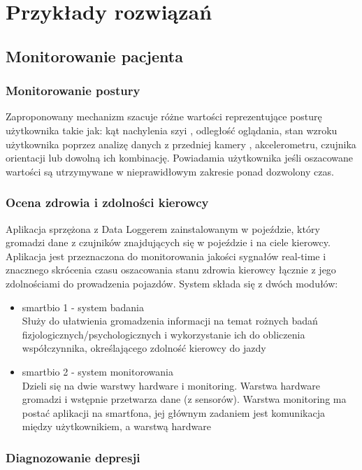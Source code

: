 \chapter{Przykłady rozwiązań}
\label{cha:przyklady_rozw}

\section{Monitorowanie pacjenta}
\label{sec:monitorowanie_pacj}
\subsection{Monitorowanie postury \cite{Lee:2012:MPM:2370216.2370320}}
Zaproponowany mechanizm szacuje różne wartości reprezentujące posturę użytkownika takie jak: kąt nachylenia szyi , odległość oglądania, stan wzroku użytkownika poprzez analizę danych z przedniej kamery , akcelerometru, czujnika orientacji lub dowolną ich kombinację. Powiadamia użytkownika jeśli oszacowane
wartości są utrzymywane w nieprawidłowym zakresie ponad dozwolony czas.

\subsection{Ocena zdrowia i zdolności kierowcy \cite{6583819}}
Aplikacja sprzężona z Data Loggerem zainstalowanym w pojeździe, który gromadzi dane z czujników znajdujących się w pojeździe i na ciele kierowcy. Aplikacja jest przeznaczona do monitorowania jakości sygnałów real-time i znacznego skrócenia czasu oszacowania stanu zdrowia kierowcy łącznie z jego zdolnościami do prowadzenia pojazdów. System składa się z dwóch modułów:
\begin{itemize}
\item smartbio 1 - system badania\\
Służy do ułatwienia gromadzenia informacji na temat rożnych badań fizjologicznych/psychologicznych i wykorzystanie ich do obliczenia współczynnika, określającego zdolność kierowcy do jazdy

\item smartbio 2 - system monitorowania\\
Dzieli się na dwie warstwy hardware i monitoring. Warstwa hardware gromadzi i wstępnie przetwarza dane (z sensorów). Warstwa monitoring ma postać aplikacji na smartfona, jej głównym zadaniem jest komunikacja między użytkownikiem, a warstwą hardware
\end{itemize}

\subsection{Diagnozowanie depresji \cite{5291726}}
 
